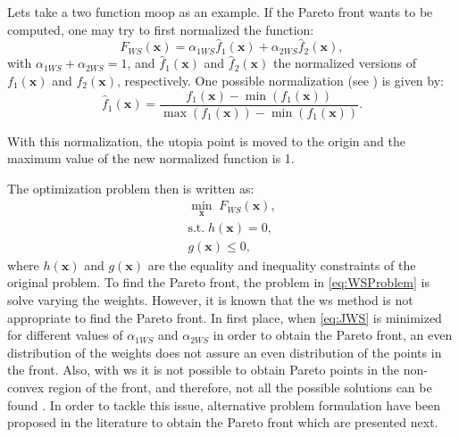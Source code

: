 Lets take a two function \gls{moop} as an example. If the Pareto front wants to be computed, one may try to first normalized the function:
\begin{equation}
F_{WS}(\mathbf{x}) = \alpha_{1WS} \hat{f}_{1}(\mathbf{x}) + \alpha_{2WS} \hat{f}_{2}(\mathbf{x}),
\label{eq:JWS}
\end{equation}
with $\alpha_{1WS} + \alpha_{2WS}=1$, and $\hat{f}_{1}(\mathbf{x})$ and $\hat{f}_{2}(\mathbf{x})$ the normalized versions of $f_{1}(\mathbf{x})$ and $f_{2}(\mathbf{x})$, respectively. One possible normalization (see \cite{Marler2004}) is given by:
\begin{equation}
\hat{f}_{1}(\mathbf{x}) = \frac{f_{1}(\mathbf{x})-\min{\left( f_{1}(\mathbf{x})\right) }}{\max{(f_{1}(\mathbf{x}))}-\min{\left( f_{1}(\mathbf{x})\right) }}.
\label{eq:NormalizedJ}
\end{equation}

With this normalization, the utopia point is moved to the origin and the maximum value of the new normalized function is 1.

The optimization problem then is written as:
\begin{equation}
\begin{gathered}
\min_{\mathbf{x}}{\; F_{WS}(\mathbf{x})}, \\
\text{s.t.} \; h(\mathbf{x})=0, \\
g(\mathbf{x}) \leq 0,
\end{gathered}
\label{eq:WSProblem}
\end{equation}
%
where $h(\mathbf{x})$ and $g(\mathbf{x})$ are the equality and inequality constraints of the original problem. To find the Pareto front, the problem in \eqref{eq:WSProblem} is solve varying the weights. However, it is known that the \gls{ws} method is not appropriate to find the Pareto front. In first place, when \eqref{eq:JWS} is minimized for different values of $\alpha_{1WS}$ and $\alpha_{2WS}$ in order to obtain the Pareto front, an even distribution of the weights does not assure an even distribution of the points in the front. Also, with \gls{ws} it is not possible to obtain Pareto points in the non-convex region of the front, and therefore, not all the possible solutions can be found \cite{Das1997}. In order to tackle this issue, alternative problem formulation have been proposed in the literature to obtain the Pareto front which are presented next.
